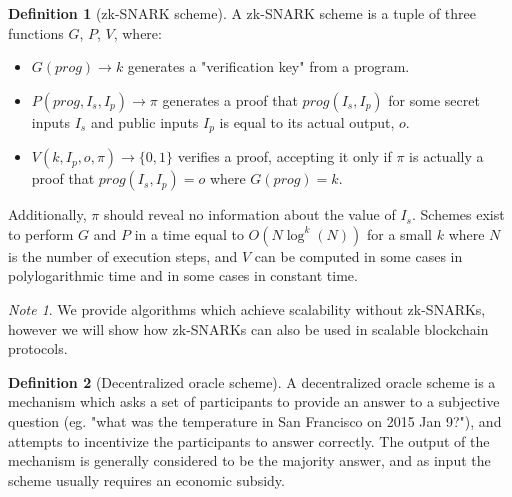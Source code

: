 \documentclass[11pt,a4paper]{report}
\theoremstyle{plain}
\theoremstyle{definition}
\newtheorem{defn}{Definition}[chapter]
\theoremstyle{remark}
\newtheorem*{note}{Note}
\begin{document}
\begin{defn}[zk-SNARK scheme]
A zk-SNARK scheme is a tuple of three functions $G$, $P$, $V$, where:
\begin{itemize}
\item
$G(prog) \rightarrow k$ generates a "verification key" from a program.
\item
$P(prog, I_s, I_p) \rightarrow \pi$ generates a proof that $prog(I_s, I_p)$ for some secret inputs $I_s$ and public inputs $I_p$ is equal to its actual output, $o$.
\item
$V(k, I_p, o, \pi) \rightarrow \{0, 1\}$ verifies a proof, accepting it only if $\pi$ is actually a proof that $prog(I_s, I_p) = o$ where $G(prog) = k$.
\end{itemize}
Additionally, $\pi$ should reveal no information about the value of $I_s$. Schemes exist \citep{ben-sasson_succinct_2014} to perform $G$ and $P$ in a time equal to $O(N\log^k(N))$ for a small $k$ where $N$ is the number of execution steps, and $V$ can be computed in some cases in polylogarithmic time and in some cases in constant time.
\end{defn}

\begin{note}
We provide algorithms which achieve scalability without zk-SNARKs, however we will show how zk-SNARKs can also be used in scalable blockchain protocols.
\end{note}

\begin{defn}[Decentralized oracle scheme]
A decentralized oracle scheme is a mechanism which asks a set of participants to provide an answer to a subjective question (eg. "what was the temperature in San Francisco on 2015 Jan 9?"), and attempts to incentivize the participants to answer correctly. The output of the mechanism is generally considered to be the majority answer, and as input the scheme usually requires an economic subsidy.
\end{defn}
\end{document}
